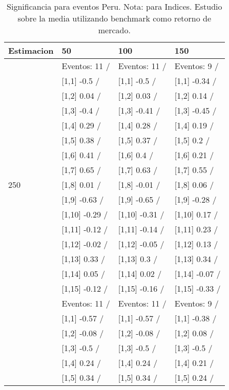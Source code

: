 \begin{table}

\caption{Significancia para eventos Peru. Nota: para Indices. Estudio sobre la media utilizando benchmark como retorno de mercado.}
\centering
\begin{tabular}[t]{llll}
\toprule
Estimacion & 50 & 100 & 150\\
\midrule
 & Eventos:  11 / & Eventos:  11 / & Eventos:  9 /\\
 & {}[1,1] -0.5  / & {}[1,1] -0.5  / & {}[1,1] -0.34  /\\
 & {}[1,2] 0.04  / & {}[1,2] 0.03  / & {}[1,2] 0.14  /\\
 & {}[1,3] -0.4  / & {}[1,3] -0.41  / & {}[1,3] -0.45  /\\
 & {}[1,4] 0.29  / & {}[1,4] 0.28  / & {}[1,4] 0.19  /\\
\addlinespace
 & {}[1,5] 0.38  / & {}[1,5] 0.37  / & {}[1,5] 0.2  /\\
 & {}[1,6] 0.41  / & {}[1,6] 0.4  / & {}[1,6] 0.21  /\\
 & {}[1,7] 0.65  / & {}[1,7] 0.63  / & {}[1,7] 0.55  /\\
250 & {}[1,8] 0.01  / & {}[1,8] -0.01  / & {}[1,8] 0.06  /\\
 & {}[1,9] -0.63  / & {}[1,9] -0.65  / & {}[1,9] -0.28  /\\
\addlinespace
 & {}[1,10] -0.29  / & {}[1,10] -0.31  / & {}[1,10] 0.17  /\\
 & {}[1,11] -0.12  / & {}[1,11] -0.14  / & {}[1,11] 0.23  /\\
 & {}[1,12] -0.02  / & {}[1,12] -0.05  / & {}[1,12] 0.13  /\\
 & {}[1,13] 0.33  / & {}[1,13] 0.3  / & {}[1,13] 0.34  /\\
 & {}[1,14] 0.05  / & {}[1,14] 0.02  / & {}[1,14] -0.07  /\\
\addlinespace
 & {}[1,15] -0.12  / & {}[1,15] -0.16  / & {}[1,15] -0.33  /\\
 & Eventos:  11 / & Eventos:  11 / & Eventos:  9 /\\
 & {}[1,1] -0.57  / & {}[1,1] -0.57  / & {}[1,1] -0.38  /\\
 & {}[1,2] -0.08  / & {}[1,2] -0.08  / & {}[1,2] 0.08  /\\
 & {}[1,3] -0.5  / & {}[1,3] -0.5  / & {}[1,3] -0.5  /\\
\addlinespace
 & {}[1,4] 0.24  / & {}[1,4] 0.24  / & {}[1,4] 0.21  /\\
 & {}[1,5] 0.34  / & {}[1,5] 0.34  / & {}[1,5] 0.24  /\\

\end{tabular}
\end{table}
